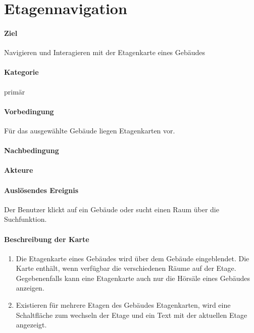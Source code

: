 \section{Etagennavigation}
\label{Etagennavigation}
\paragraph{Ziel}
Navigieren und Interagieren mit der Etagenkarte eines Gebäudes
\paragraph{Kategorie}
primär
\paragraph{Vorbedingung}
Für das ausgewählte Gebäude liegen Etagenkarten vor.
\paragraph{Nachbedingung}

\paragraph{Akteure}

\paragraph{Auslösendes Ereignis}
Der Benutzer klickt auf ein Gebäude oder sucht einen Raum über die Suchfunktion.
\paragraph{Beschreibung der Karte}
\begin{enumerate}
    \item Die Etagenkarte eines Gebäudes wird über dem Gebäude eingeblendet. Die Karte enthält, wenn verfügbar die verschiedenen Räume auf der Etage. Gegebenenfalls kann eine Etagenkarte auch nur die Hörsäle eines Gebäudes anzeigen.
    \item Existieren für mehrere Etagen des Gebäudes Etagenkarten, wird eine Schaltfläche zum wechseln der Etage und ein Text mit der aktuellen Etage angezeigt.
\end{enumerate}
